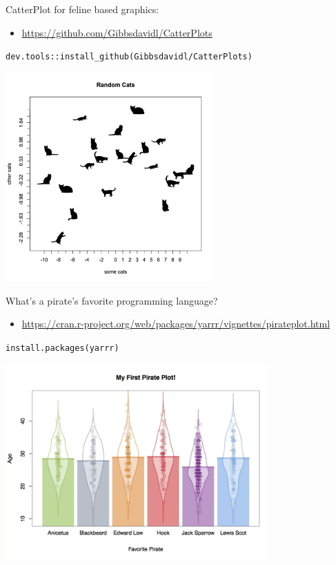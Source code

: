 \documentclass[ignorenonframetext,]{beamer}
\providecommand{\tightlist}{%
  \setlength{\itemsep}{0pt}\setlength{\parskip}{0pt}}
\begin{document}
\begin{frame}[fragile]{CatterPlot for feline based graphics:}
\protect\hypertarget{catterplot-for-feline-based-graphics}{}

\begin{itemize}
\tightlist
\item
  \url{https://github.com/Gibbsdavidl/CatterPlots}
\end{itemize}

\texttt{dev.tools::install\_github(Gibbsdavidl/CatterPlots)}

\includegraphics[width=0.6\textwidth,height=\textheight]{../external/images/funR_1_catterplotter.png}

\end{frame}

\begin{frame}[fragile]{What's a pirate's favorite programming language?}
\protect\hypertarget{whats-a-pirates-favorite-programming-language}{}

\begin{itemize}
\tightlist
\item
  \url{https://cran.r-project.org/web/packages/yarrr/vignettes/pirateplot.html}
\end{itemize}

\texttt{install.packages(\textquotesingle{}yarrr\textquotesingle{})}

\includegraphics[width=0.75\textwidth,height=\textheight]{../external/images/funR_2_pirate.png}

\end{frame}
\end{document}
